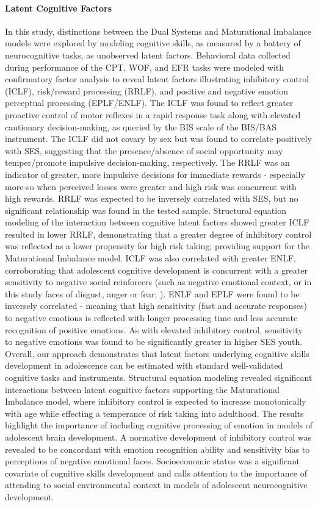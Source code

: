 \documentclass[utf8]{frontiersSCNS} %
\begin{document}
\paragraph*{Latent Cognitive Factors} In this study, distinctions between the Dual Systems and Maturational Imbalance models were explored by modeling cognitive skills, as measured by a battery of neurocognitive tasks, as unobserved latent factors. Behavioral data collected during performance of the CPT, WOF, and EFR tasks were modeled with confirmatory factor analysis to reveal latent factors illustrating inhibitory control (ICLF), risk/reward processing (RRLF), and positive and negative emotion perceptual processing (EPLF/ENLF). The ICLF was found to reflect greater proactive control of motor reflexes in a rapid response task along with elevated cautionary decision-making, as queried by the BIS scale of the BIS/BAS instrument. The ICLF did not covary by sex but was found to correlate positively with SES, suggesting that the presence/absence of social opportunity may temper/promote impulsive decision-making, respectively. The RRLF was an indicator of greater, more impulsive decisions for immediate rewards - especially more-so when perceived losses were greater and high risk was concurrent with high rewards. RRLF was expected to be inversely correlated with SES, but no significant relationship was found in the tested sample. Structural equation modeling of the interaction between cognitive latent factors showed greater ICLF resulted in lower RRLF, demonstrating that a greater degree of inhibitory control was reflected as a lower propensity for high risk taking; providing support for the Maturational Imbalance model. ICLF was also correlated with greater ENLF, corroborating that adolescent cognitive development is concurrent with a greater sensitivity to negative social reinforcers (such as negative emotional context, or in this study faces of disgust, anger or fear; \cite{jones2014adolescent, rosenbaum2020valence}). ENLF and EPLF were found to be inversely correlated - meaning that high sensitivity (fast and accurate responses) to negative emotions is reflected with longer processing time and less accurate recognition of positive emotions. As with elevated inhibitory control, sensitivity to negative emotions was found to be significantly greater in higher SES youth.
Overall, our approach demonstrates that latent factors underlying cognitive skills development in adolescence can be estimated with standard well-validated cognitive tasks and instruments. Structural equation modeling revealed significant interactions between latent cognitive factors supporting the Maturational Imbalance model, where inhibitory control is expected to increase monotonically with age while effecting a temperance of risk taking into adulthood. The results highlight the importance of including cognitive processing of emotion in models of adolescent brain development. A normative development of inhibitory control was revealed to be concordant with emotion recognition ability and sensitivity bias to perceptions of negative emotional faces. Socioeconomic status was a significant covariate of cognitive skills development and calls attention to the importance of attending to social environmental context in models of adolescent neurocognitive development.
\vspace{2pt}
\end{document}
